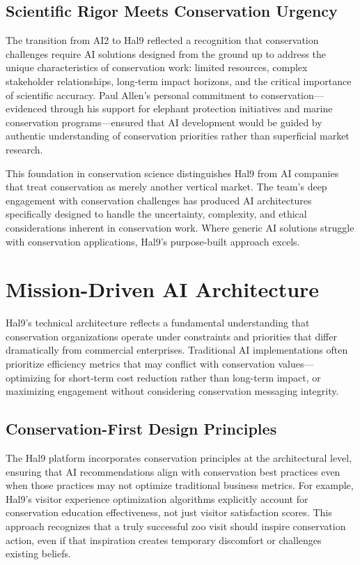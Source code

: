 \documentclass[
  Letterpaper,
]{scrbook}
\begin{document}
\subsection{Scientific Rigor Meets Conservation
Urgency}\label{scientific-rigor-meets-conservation-urgency}

The transition from AI2 to Hal9 reflected a recognition that
conservation challenges require AI solutions designed from the ground up
to address the unique characteristics of conservation work: limited
resources, complex stakeholder relationships, long-term impact horizons,
and the critical importance of scientific accuracy. Paul Allen's
personal commitment to conservation---evidenced through his support for
elephant protection initiatives and marine conservation
programs---ensured that AI development would be guided by authentic
understanding of conservation priorities rather than superficial market
research.

This foundation in conservation science distinguishes Hal9 from AI
companies that treat conservation as merely another vertical market. The
team's deep engagement with conservation challenges has produced AI
architectures specifically designed to handle the uncertainty,
complexity, and ethical considerations inherent in conservation work.
Where generic AI solutions struggle with conservation applications,
Hal9's purpose-built approach excels.

\section{Mission-Driven AI
Architecture}\label{mission-driven-ai-architecture}

Hal9's technical architecture reflects a fundamental understanding that
conservation organizations operate under constraints and priorities that
differ dramatically from commercial enterprises. Traditional AI
implementations often prioritize efficiency metrics that may conflict
with conservation values---optimizing for short-term cost reduction
rather than long-term impact, or maximizing engagement without
considering conservation messaging integrity.

\subsection{Conservation-First Design
Principles}\label{conservation-first-design-principles}

The Hal9 platform incorporates conservation principles at the
architectural level, ensuring that AI recommendations align with
conservation best practices even when those practices may not optimize
traditional business metrics. For example, Hal9's visitor experience
optimization algorithms explicitly account for conservation education
effectiveness, not just visitor satisfaction scores. This approach
recognizes that a truly successful zoo visit should inspire conservation
action, even if that inspiration creates temporary discomfort or
challenges existing beliefs.
\end{document}
